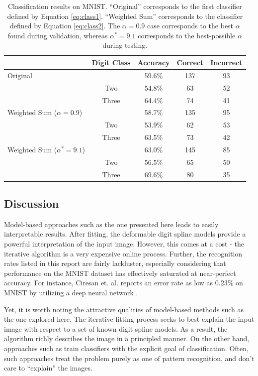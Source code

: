 \documentclass[oribibl]{llncs}
\begin{document}
\begin{table}
\centering
  \begin{tabular}{ l | c || c | c | c }
  & Digit Class & Accuracy & Correct & Incorrect \\ \hline
    Original & &  59.6\% & 137 & 93 \\
    & Two & 54.8\% & 63 & 52 \\
    & Three & 64.4\% & 74 & 41 \\ \hline
    Weighted Sum ($\alpha = 0.9$) & & 58.7\% & 135 & 95 \\
    & Two & 53.9\% & 62 & 53 \\
    & Three & 63.5\% & 73 & 42 \\ \hline
    Weighted Sum ($\alpha^{*} = 9.1$) & & 63.0\% & 145 & 85 \\
    & Two & 56.5\% & 65 & 50 \\
    & Three & 69.6\% & 80 & 35 \\ \hline    
  \end{tabular}
\vspace{1em}
\caption{Classification results on MNIST. ``Original'' corresponds to the first classifier defined by Equation \ref{eq:class1}. ``Weighted Sum'' corresponds to the classifier defined by Equation \ref{eq:class2}. The $\alpha=0.9$ case corresponds to the best $\alpha$ found during validation, whereas $\alpha^{*}=9.1$ corresponds to the best-possible $\alpha$ during testing.}
\label{tab:results}
\end{table}

\subsection{Discussion}

Model-based approaches such as the one presented here leads to easily interpretable results.
After fitting, the deformable digit spline models provide a powerful interpretation of the input image.
However, this comes at a cost - the iterative algorithm is a very expensive online process.
Further, the recognition rates listed in this report are fairly lackluster, especially considering that performance on the MNIST dataset has effectively saturated at near-perfect accuracy.
For instance, Ciresan et. al. reports an error rate as low as 0.23\% on MNIST by utilizing a deep neural network \cite{ciresan}.

Yet, it is worth noting the attractive qualities of model-based methods such as the one explored here.  
The iterative fitting process seeks to best explain the input image with respect to a set of known digit spline models.
As a result, the algorithm richly describes the image in a principled manner.
On the other hand, approaches such as \cite{ciresan} train classifiers with the explicit goal of classification.
Often, such approaches treat the problem purely as one of pattern recognition, and don't care to ``explain'' the images.
\end{document}
